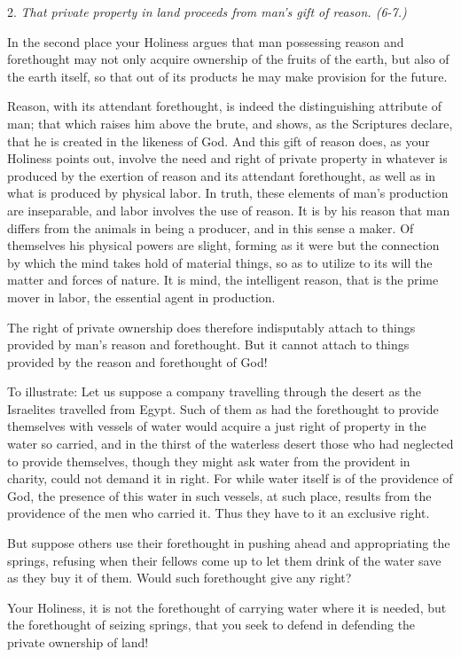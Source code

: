 \documentclass{book}
\begin{document}
2. \emph{That private property in land proceeds from man’s gift of reason. (6-7.)}

In the second place your Holiness argues that man possessing reason and forethought may not only acquire ownership of the fruits of the earth, but also of the earth itself, so that out of its products he may make provision for the future.

Reason, with its attendant forethought, is indeed the distinguishing attribute of man; that which raises him above the brute, and shows, as the Scriptures declare, that he is created in the likeness of God. And this gift of reason does, as your Holiness points out, involve the need and right of private property in whatever is produced by the exertion of reason and its attendant forethought, as well as in what is produced by physical labor. In truth, these elements of man’s production are inseparable, and labor involves the use of reason. It is by his reason that man differs from the animals in being a producer, and in this sense a maker. Of themselves his physical powers are slight, forming as it were but the connection by which the mind takes hold of material things, so as to utilize to its will the matter and forces of nature. It is mind, the intelligent reason, that is the prime mover in labor, the essential agent in production.

The right of private ownership does therefore indisputably attach to things provided by man’s reason and forethought. But it cannot attach to things provided by the reason and forethought of God!

To illustrate: Let us suppose a company travelling through the desert as the Israelites travelled from Egypt. Such of them as had the forethought to provide themselves with vessels of water would acquire a just right of property in the water so carried, and in the thirst of the waterless desert those who had neglected to provide themselves, though they might ask water from the provident in charity, could not demand it in right. For while water itself is of the providence of God, the presence of this water in such vessels, at such place, results from the providence of the men who carried it. Thus they have to it an exclusive right.

But suppose others use their forethought in pushing ahead and appropriating the springs, refusing when their fellows come up to let them drink of the water save as they buy it of them. Would such forethought give any right?

Your Holiness, it is not the forethought of carrying water where it is needed, but the forethought of seizing springs, that you seek to defend in defending the private ownership of land!
\end{document}
